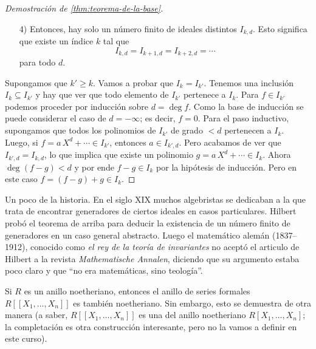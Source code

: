 \begin{proof}[Demostración de \ref{thm:teorema-de-la-base}]
\begin{enumerate}
  \item[4)] Entonces, hay solo un número finito de ideales distintos
    $I_{k,d}$. Esto significa que existe un índice $k$ tal que
    $$I_{k,d} = I_{k+1,d} = I_{k+2,d} = \cdots$$
    para todo $d$.
  \end{enumerate}

  Supongamos que $k' \ge k$. Vamos a probar que $I_k = I_{k'}$. Tenemos una
  inclusión $I_k \subseteq I_{k'}$ y hay que ver que todo elemento de $I_{k'}$
  pertenece a $I_k$. Para $f\in I_{k'}$ podemos proceder por inducción sobre
  $d = \deg f$. Como la base de inducción se puede considerar el caso de
  $d = -\infty$; es decir, $f = 0$. Para el paso inductivo, supongamos que todos
  los polinomios de $I_{k'}$ de grado $< d$ pertenecen a $I_k$. Luego,
  si $f = a\,X^d + \cdots \in I_{k'}$, entonces $a\in I_{k',d}$. Pero acabamos
  de ver que $I_{k',d} = I_{k,d}$, lo que implica que existe un polinomio
  $g = a\,X^d + \cdots \in I_k$. Ahora $\deg (f-g) < d$ y por ende $f-g \in I_k$
  por la hipótesis de inducción. Pero en este caso $f = (f-g) + g \in I_k$.
\end{proof}

Un poco de la historia. En el siglo XIX muchos algebristas se dedicaban a
la  que trata de encontrar generadores de ciertos
ideales en casos particulares. Hilbert probó el teorema de arriba para deducir
la existencia de un número finito de generadores en un caso general
abstracto. Luego el matemático alemán  (1837--1912),
conocido como \emph{el rey de la teoría de invariantes} no aceptó el articulo
de Hilbert a la revista \emph{Mathematische Annalen}, diciendo que su argumento
estaba poco claro y que ``no era matemáticas, sino teología''.

\begin{digresion}
  Si $R$ es un anillo noetheriano, entonces el anillo de series formales
  $R [\![X_1,\ldots,X_n]\!]$ es también noetheriano. Sin embargo, esto
  se demuestra de otra manera (a saber, $R [\![X_1,\ldots,X_n]\!]$ es una
   del anillo noetheriano $R [X_1,\ldots,X_n]$;
  la completación es otra construcción interesante, pero no la vamos a definir
  en este curso).
\end{digresion}

